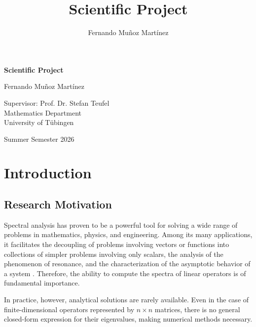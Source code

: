 \documentclass[11pt]{article}
\title{Scientific Project}
\author{Fernando Muñoz Martínez}
\begin{document}
\begin{titlepage}
 
\thispagestyle{empty}

    \begin{center}
        \mbox{}\vfill
        \LARGE
        \textbf{Scientific Project} 
	
        \vspace{1 cm}
        \large
        Fernando Muñoz Martínez
        
        \vspace{1 cm}	
        \large
        Supervisor: Prof. Dr. Stefan Teufel \\
        Mathematics Department \\
        University of Tübingen

        \vspace{1 cm}
        \large
        Summer Semester 2026
    \end{center}

    \vspace{10 cm}
    \large
        
\end{titlepage}

\newpage

\tableofcontents

\newpage

\section{Introduction}

\subsection{Research Motivation}

Spectral analysis has proven to be a powerful tool for solving a wide range of problems in mathematics, physics, and engineering. Among its many applications, it facilitates the decoupling of problems involving vectors or functions into collections of simpler problems involving only scalars, the analysis of the phenomenon of resonance, and the characterization of the asymptotic behavior of a system \cite{pseudospectra}. Therefore, the ability to compute the spectra of linear operators is of fundamental importance.

In practice, however, analytical solutions are rarely available. Even in the case of finite-dimensional operators represented by $n \times n$ matrices, there is no general closed-form expression for their eigenvalues, making numerical methods necessary.
\end{document}
